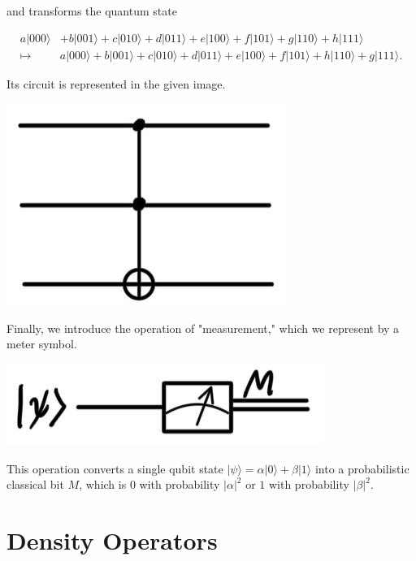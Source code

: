 \documentclass{article}
\theoremstyle{definition}
\begin{document}
\begin{enumerate}
        and transforms the quantum state

          \begin{align*}
            a|000\rangle & + b|001\rangle + c|010\rangle + d |011\rangle + e|100\rangle + f |101\rangle + g|110\rangle + h|111\rangle \\
            \mapsto & a|000\rangle + b|001\rangle + c|010\rangle + d |011\rangle + e|100\rangle + f |101\rangle + h|110\rangle + g|111\rangle.
          \end{align*}

          Its circuit is represented in the given image.

          \begin{center}
            \includegraphics[scale=0.3]{img/Toffoli_gate.jpg}
          \end{center}
      \end{enumerate}

      Finally, we introduce the operation of "measurement," which we represent by a meter symbol.

      \begin{center}
        \includegraphics[scale=0.3]{img/Measurement_gate.jpg}
      \end{center}

      This operation converts a single qubit state $| \psi \rangle = \alpha |0\rangle + \beta |1\rangle$ into a probabilistic classical bit $M$, which is $0$ with probability $|\alpha|^2$ or $1$ with probability $|\beta|^2$. 

\section{Density Operators}
\end{document}
